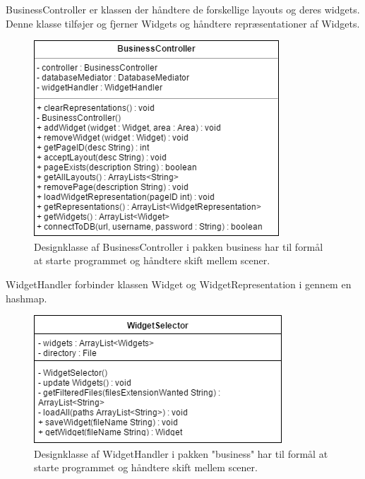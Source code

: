 BusinessController er klassen der håndtere de forskellige layouts og deres widgets. Denne klasse tilføjer og fjerner Widgets og håndtere repræsentationer af Widgets. 
      \begin{figure}[H]
      \includegraphics[width=\linewidth]{elaborationsdokumentet/figurer/design/designklasser/Designklasse-BusinessController.png}
      \caption{Designklasse af BusinessController i pakken business har til formål at starte programmet og håndtere skift mellem scener.}
      \label{Designklasse-BusinessController}
  \end{figure}
  
WidgetHandler forbinder klassen Widget og WidgetRepresentation i gennem en hashmap.
        \begin{figure}[H]
      \includegraphics[width=\linewidth]{elaborationsdokumentet/figurer/design/designklasser/Designklasse-WidgetSelector.png}
      \caption{Designklasse af WidgetHandler i pakken "business" har til formål at starte programmet og håndtere skift mellem scener.}
      \label{Designklasse-WidgetHandler}
  \end{figure}
  
